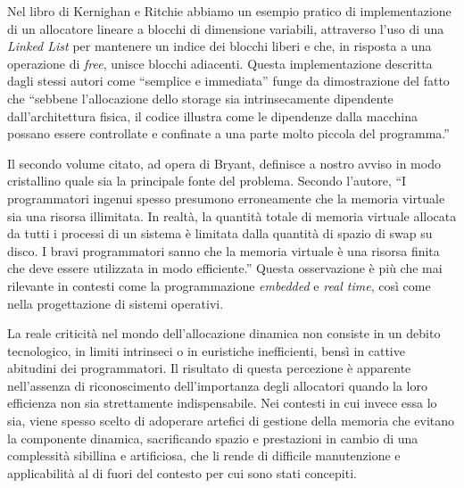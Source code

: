 Nel libro di Kernighan e Ritchie abbiamo un esempio pratico di implementazione di un allocatore lineare a blocchi di dimensione variabili, attraverso l’uso di una \textit{Linked List} per mantenere un indice dei blocchi liberi e che, in risposta a una operazione di \textit{free}, unisce blocchi adiacenti. Questa implementazione descritta dagli stessi autori come ``semplice e immediata'' funge da dimostrazione del fatto che ``sebbene l’allocazione dello storage sia intrinsecamente dipendente dall’architettura fisica, il codice illustra come le dipendenze dalla macchina possano essere controllate e confinate a una parte molto piccola del programma.''

Il secondo volume citato, ad opera di Bryant, definisce a nostro avviso in modo cristallino quale sia la principale fonte del problema. Secondo l’autore, ``I programmatori ingenui spesso presumono erroneamente che la memoria virtuale sia una risorsa illimitata. In realtà, la quantità totale di memoria virtuale allocata da tutti i processi di un sistema è limitata dalla quantità di spazio di swap su disco. I bravi programmatori sanno che la memoria virtuale è una risorsa finita che deve essere utilizzata in modo efficiente.'' Questa osservazione è più che mai rilevante in contesti come la programmazione \textit{embedded} e \textit{real time}, così come nella progettazione di sistemi operativi.

La reale criticità nel mondo dell’allocazione dinamica non consiste in un debito tecnologico, in limiti intrinseci o in euristiche inefficienti, bensì in cattive abitudini dei programmatori. Il risultato di questa percezione è apparente nell’assenza di riconoscimento dell’importanza degli allocatori quando la loro efficienza non sia strettamente indispensabile. Nei contesti in cui invece essa lo sia, viene spesso scelto di adoperare artefici di gestione della memoria che evitano la componente dinamica, sacrificando spazio e prestazioni in cambio di una complessità sibillina e artificiosa, che li rende di difficile manutenzione e applicabilità al di fuori del contesto per cui sono stati concepiti.

